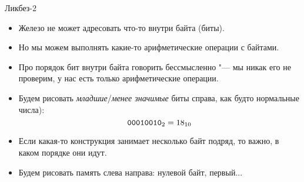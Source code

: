 \begin{frame}{Ликбез-2}
	\begin{itemize}
		\item
			Железо не может адресовать что-то внутри байта (биты).
		\item
			Но мы можем выполнять какие-то арифметические операции с байтами.
		\item
			Про порядок бит внутри байта говорить бессмысленно "--- мы никак его не проверим, у нас есть только арифметические операции.
		\item
			Будем рисовать \textit{младшие}/\textit{менее значимые} биты справа, как будто нормальные числа):
			\[ \t{0001 0010}_2 = 18_{10} \]
		\item
			Если какая-то конструкция занимает несколько байт подряд, то важно, в каком порядке они идут.
		\item
			Будем рисовать память слева направа: нулевой байт, первый...
	\end{itemize}
\end{frame}

